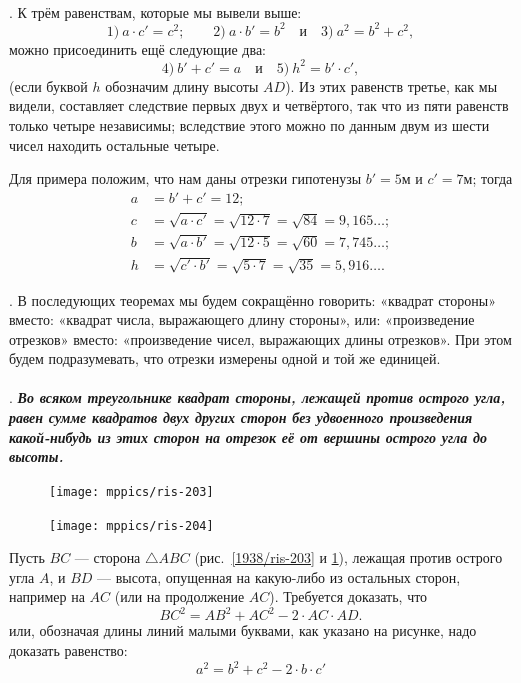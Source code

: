 \documentclass[oneside]{book}
\begin{document}
\paragraph{}\label{1938/193}
.
К трём равенствам, которые мы вывели выше:
\[1)\ a\cdot c'=c^2;
\qquad
2)\ a\cdot b'=b^2
\quad
\text{и}
\quad
3)\ a^2=b^2+c^2,
\]
можно присоединить ещё следующие два:
\[4)\ b'+c'=a
\quad
\text{и}
\quad
5)\ h^2=b'\cdot c',
\]
(если буквой $h$ обозначим длину высоты $AD$).
Из этих равенств третье, как мы видели, составляет следствие первых двух и четвёртого, так что из пяти равенств только четыре независимы;
вследствие этого можно по данным двум из шести чисел находить остальные четыре.

Для примера положим, что нам даны отрезки гипотенузы $b' = 5 \text{м}$ и $c' = 7\text{м}$;
тогда
\begin{align*}
a&=b'+c'=12;
\\
c&=\sqrt{a\cdot c'}=
\sqrt{12\cdot 7}=
\sqrt{84}=9{,}165\dots;
\\
b&=\sqrt{a\cdot b'}=\sqrt{12\cdot 5}=\sqrt{60}=7{,}745\dots;
\\
h&=\sqrt{c'\cdot b'}=\sqrt{5\cdot 7}=\sqrt{35} = 5{,}916\dots.
\end{align*}


.
В последующих теоремах мы будем сокращённо говорить:
«квадрат стороны» вместо: «квадрат числа, выражающего длину стороны», 
или: «произведение отрезков» вместо:
«произведение чисел, выражающих длины отрезков».
При этом будем подразумевать, что отрезки измерены одной и той же единицей.

\paragraph{}\label{1938/194} %
.
\textbf{\emph{Во всяком треугольнике квадрат стороны, лежащей против острого угла, равен сумме квадратов двух других сторон без удвоенного произведения какой-нибудь из этих сторон на отрезок её от вершины острого угла до высоты.}}

\begin{figure}
\centering
\texttt{[image: mppics/ris-203]}
\caption{}\label{1938/ris-203}
\bigskip
\texttt{[image: mppics/ris-204]}
\caption{}\label{1938/ris-204}
\end{figure}

Пусть $BC$ — сторона $\triangle ABC$ (рис.~\ref{1938/ris-203} и \ref{1938/ris-204}), лежащая против острого угла $A$, и $BD$ — высота, опущенная на какую-либо из остальных сторон, %
например на $AC$ (или на продолжение $AC$).
Требуется доказать, что
\[BC^2=AB^2+AC^2-2\cdot AC\cdot  AD.\]
или, обозначая длины линий малыми буквами, как указано на рисунке, надо доказать равенство:
\[a^2=b^2+c^2-2\cdot b\cdot c'\]
\end{document}
